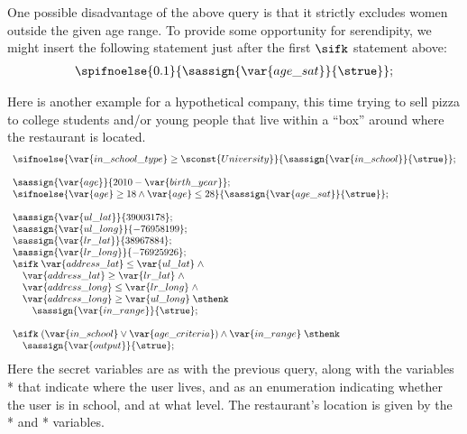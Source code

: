 One possible disadvantage of the above query is that it strictly excludes
women outside the given age range.  To provide some opportunity for
serendipity, we might insert the following statement just after the first
$\sifk$ statement above:
\begin{displaymath}
\begin{array}{l}
\spifnoelse{0.1}{\sassign{\var{age\_sat}}{\strue}}; \\
\end{array}
\end{displaymath}
\begin{example}
  Here is another example for a hypothetical company, this time trying
  to sell pizza to college students and/or young people that live
  within a ``box'' around where the restaurant is located.
\begin{displaymath}
\begin{array}{l}
\sifnoelse{\var{in\_school\_type} \geq \sconst{University}}{
  \sassign{\var{in\_school}}{\strue}}; \\
~\\
\sassign{\var{age}}{2010 - \var{birth\_year}}; \\
\sifnoelse{\var{age} \geq 18 \wedge \var{age} \leq 28}{
  \sassign{\var{age\_sat}}{\strue}}; \\
~\\
\sassign{\var{ul\_lat}}{39003178}; \\
\sassign{\var{ul\_long}}{-76958199}; \\
\sassign{\var{lr\_lat}}{38967884}; \\
\sassign{\var{lr\_long}}{-76925926}; \\
\sifk\; \var{address\_lat} \leq \var{ul\_lat}\; \wedge  \\
\quad  \var{address\_lat} \geq \var{lr\_lat}\; \wedge \\
\quad  \var{address\_long} \leq \var{lr\_long}\; \wedge \\
\quad  \var{address\_long} \geq \var{ul\_long}\;\sthenk \\
\quad \quad \sassign{\var{in\_range}}{\strue}; \\
~\\
\sifk\; (\var{in\_school} \vee \var{age\_criteria}) \wedge
\var{in\_range}\; \sthenk \\
\quad \sassign{\var{output}}{\strue};
\end{array}
\end{displaymath}
  Here the secret variables are as with the previous query, along with
  the variables * that indicate where the user lives,
  and  as an enumeration indicating whether the
  user is in school, and at what level.  The restaurant's location is
  given by the * and * variables.
\end{example}
